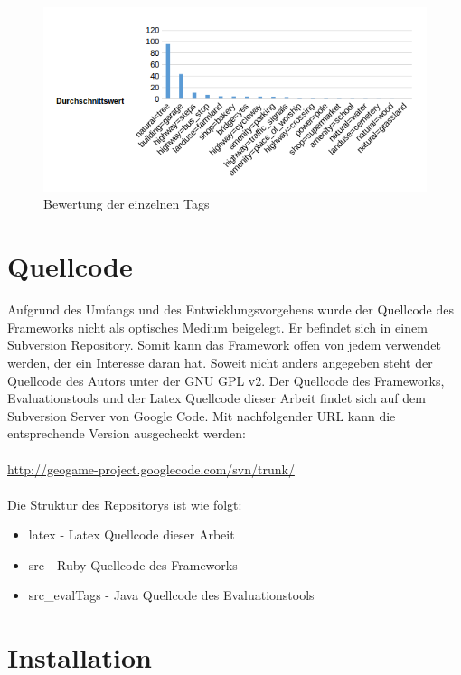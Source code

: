 \begin{figure}[H]
\begin{center}
\includegraphics[width=150mm]{images/ch8_valued3.png}
\caption{Bewertung der einzelnen Tags}
\label{img:ch8_valued3}
\end{center}
\end{figure}

\newpage

\section{Quellcode}

Aufgrund des Umfangs und des Entwicklungsvorgehens wurde der Quellcode des Frameworks nicht als optisches Medium beigelegt. Er befindet sich in einem Subversion Repository.
Somit kann das Framework offen von jedem verwendet werden, der ein Interesse daran hat. Soweit nicht anders angegeben steht der Quellcode des Autors unter der GNU GPL v2.
Der Quellcode des Frameworks, Evaluationstools und der Latex Quellcode dieser Arbeit findet sich auf dem Subversion Server von Google Code.
Mit nachfolgender URL kann die entsprechende Version ausgecheckt werden:\\\\
\url{http://geogame-project.googlecode.com/svn/trunk/}\\\\

Die Struktur des Repositorys ist wie folgt:
\begin{itemize}
\item latex - Latex Quellcode dieser Arbeit
\item src - Ruby Quellcode des Frameworks
\item src\_evalTags - Java Quellcode des Evaluationstools
\end{itemize}

\section{Installation}

